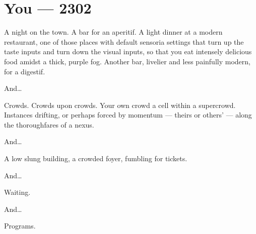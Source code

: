 \chapter*{You — 2302}

\null
\vfill
A night on the town. A bar for an aperitif. A light dinner at a modern restaurant, one of those places with default sensoria settings that turn up the taste inputs and turn down the visual inputs, so that you eat intensely delicious food amidst a thick, purple fog. Another bar, livelier and less painfully modern, for a digestif.

\vfill

\newpage

\null
\vfill

\noindent And\ldots{}

\null
\vfill

\newpage

\null
\vfill

\noindent Crowds. Crowds upon crowds. Your own crowd a cell within a supercrowd. Instances drifting, or perhaps forced by momentum --- theirs or others' --- along the thoroughfares of a nexus.

\null
\vfill

\newpage

\null
\vfill

\noindent And\ldots{}

\null
\vfill

\newpage

\null
\vfill

\noindent A low slung building, a crowded foyer, fumbling for tickets.

\null
\vfill

\newpage

\null
\vfill

\noindent And\ldots{}

\null
\vfill

\newpage

\null
\vfill

\noindent Waiting.

\null
\vfill

\newpage

\null
\vfill

\noindent And\ldots{}

\null
\vfill

\newpage

\null
\vfill

\noindent Programs.

